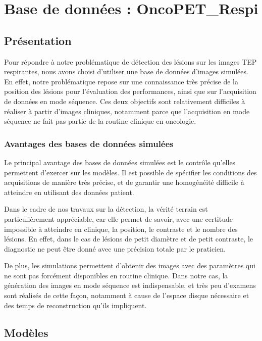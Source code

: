 \chapter{Base de données : OncoPET\_Respi}
	\label{lab:bdd}

\section{Présentation}

Pour répondre à notre problématique de détection des lésions sur les images TEP respirantes, nous avons choisi d’utiliser une base de données d’images simulées. En effet, notre problématique repose sur une connaissance très précise de la position des lésions pour l’évaluation des performances, ainsi que sur l’acquisition de données en mode séquence. Ces deux objectifs sont relativement difficiles à réaliser à partir d’images cliniques, notamment parce que l'acquisition en mode séquence ne fait pas partie de la routine clinique en oncologie.



	\subsection{Avantages des bases de données simulées}

Le principal avantage des bases de données simulées est le contrôle qu'elles permettent d'exercer sur les modèles. Il est possible de spécifier les conditions des acquisitions de manière très précise, et de garantir une homogénéité difficile à atteindre en utilisant des données patient.

Dans le cadre de nos travaux sur la détection, la vérité terrain est particulièrement appréciable, car elle permet de savoir, avec une certitude impossible à atteindre en clinique, la position, le contraste et le nombre des lésions. En effet, dans le cas de lésions de petit diamètre et de petit contraste, le diagnostic ne peut être donné avec une précision totale par le praticien. 

De plus, les simulations permettent d’obtenir des images avec des paramètres qui ne sont pas forcément disponibles en routine clinique. Dans notre cas, la génération des images en mode séquence est indispensable, et très peu d’examens sont réalisés de cette façon, notamment à cause de l’espace disque nécessaire et des temps de reconstruction qu'ils impliquent.

	\section{Modèles}

